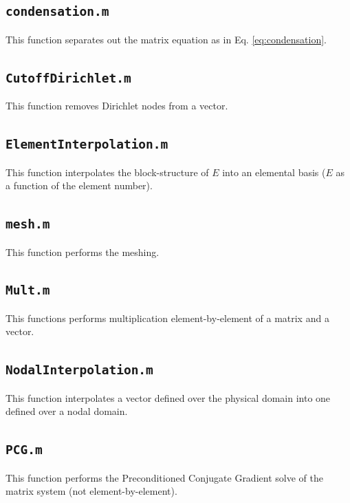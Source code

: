 \documentclass[10pt]{article}
\begin{document}
\subsection{\texttt{condensation.m}}
This function separates out the matrix equation as in Eq. \eqref{eq:condensation}.


\subsection{\texttt{CutoffDirichlet.m}}
This function removes Dirichlet nodes from a vector.


\subsection{\texttt{ElementInterpolation.m}}
This function interpolates the block-structure of \(E\) into an elemental basis (\(E\) as a function of the element number).


\subsection{\texttt{mesh.m}}
This function performs the meshing.


\subsection{\texttt{Mult.m}}
This functions performs multiplication element-by-element of a matrix and a vector.


\subsection{\texttt{NodalInterpolation.m}}
This function interpolates a vector defined over the physical domain into one defined over a nodal domain.


\subsection{\texttt{PCG.m}}
This function performs the Preconditioned Conjugate Gradient solve of the matrix system (not element-by-element).

\end{document}
